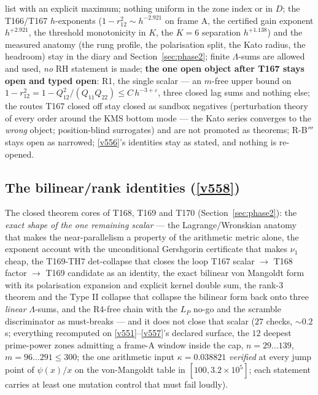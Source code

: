 \documentclass[11pt,a4paper]{article}
\begin{document}
\begin{itemize}[leftmargin=1.5em]
{list} with an explicit maximum; nothing uniform in the zone index or in $D$; the
T166/T167 $h$-exponents ($1-r_{12}^2\sim h^{-2.921}$ on frame A, the certified gain
exponent $h^{+2.921}$, the threshold monotonicity in $K$, the $K=6$ separation
$h^{+1.138}$) and the measured anatomy (the rung profile, the polarisation split, the
Kato radius, the headroom) stay in the diary and Section~\ref{sec:phase2}; finite
$\Lambda$-sums are allowed and used, \emph{no} RH statement is made; \textbf{the one
open object after T167 stays open and typed open}: R1, the single scalar --- an
$m$-free upper bound on $1-r_{12}^2=1-Q_{12}^2/(Q_{11}Q_{22})\le C\,h^{-3+\varepsilon}$,
three closed lag sums and nothing else; the routes T167 closed off stay closed as
sandbox negatives (perturbation theory of every order around the KMS bottom mode ---
the Kato series converges to the \emph{wrong} object; position-blind surrogates) and
are not promoted as theorems; R-B$'''$ stays open as narrowed; \vref{v556}'s
identities stay as stated, and nothing is re-opened.
\end{itemize}

\subsection{The bilinear/rank identities (\texorpdfstring{\vref{v558}}{v558})}\label{sec:v558}
The closed theorem cores of T168, T169 and T170 (Section~\ref{sec:phase2}): the \emph{exact
shape of the one remaining scalar} --- the Lagrange/Wronskian anatomy that makes the
near-parallelism a property of the arithmetic metric alone, the exponent account with the
unconditional Gershgorin certificate that makes $\nu_1$ cheap, the T169-TH7 det-collapse
that closes the loop T167 scalar $\to$ T168 factor $\to$ T169 candidate as an identity, the
exact bilinear von Mangoldt form with its polarisation expansion and explicit kernel double
sum, the rank-3 theorem and the Type II collapse that collapse the bilinear form back onto
three \emph{linear} $\Lambda$-sums, and the R4-free chain with the $L_P$ no-go and the
scramble discriminator as must-breaks --- and it does not close that scalar
 ($27$ checks, ${\sim}0.2$\,s; everything
recomputed on \vref{v551}--\vref{v557}'s declared surface, the $12$ deepest prime-power zones
admitting a frame-A window inside the cap, $n=29\ldots139$, $m=96\ldots291\le300$; the one
arithmetic input $\kappa=0.038821$ \emph{verified} at every jump point of $\psi(x)/x$ on the
von-Mangoldt table in $[100,3.2\times10^{5}]$; each statement carries at least one mutation
control that must fail loudly).
\end{document}
